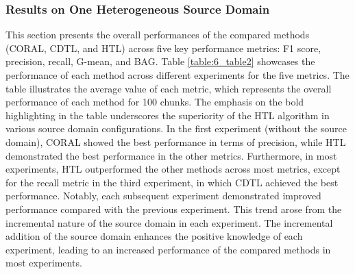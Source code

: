 \subsubsection{Results on One Heterogeneous Source Domain}
  This section presents the overall performances of the compared methods (CORAL, CDTL, and HTL) across five key performance metrics: F1 score, precision, recall, G-mean, and BAG. Table \ref{table:6_table2} showcases the performance of each method across different experiments for the five metrics. The table illustrates the average value of each metric, which represents the overall performance of each method for 100 chunks. The emphasis on the bold highlighting in the table underscores the superiority of the HTL algorithm in various source domain configurations. In the first experiment (without the source domain), CORAL showed the best performance in terms of precision, while HTL demonstrated the best performance in the other metrics. Furthermore, in most experiments, HTL outperformed the other methods across most metrics, except for the recall metric in the third experiment, in which CDTL achieved the best performance. Notably, each subsequent experiment demonstrated improved performance compared with the previous experiment. This trend arose from the incremental nature of the source domain in each experiment. The incremental addition of the source domain enhances the positive knowledge of each experiment, leading to an increased performance of the compared methods in most experiments.
  
